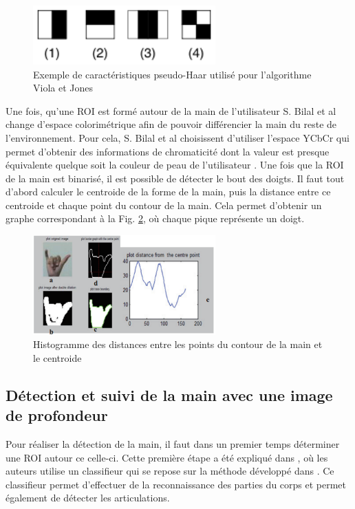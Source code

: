 \begin{figure}[!h]
\center
\includegraphics[width=7cm]{images/pseudo_haar.png}
\caption{Exemple de caractéristiques pseudo-Haar utilisé pour l'algorithme Viola et Jones}
\label{fig:pseudo_haar}
\end{figure}

Une fois, qu'une ROI est formé autour de la main de l'utilisateur S. Bilal et al \cite{haarlike} change d'espace colorimétrique
afin de pouvoir différencier la main du reste de l'environnement. Pour cela, S. Bilal et al \cite{haarlike} choisissent 
d'utiliser l'espace YCbCr qui permet d'obtenir des informations de chromaticité dont la valeur est presque équivalente
quelque soit la couleur de peau de l'utilisateur \cite{yoo1999fast}. Une fois que la ROI de la main est binarisé, il est possible
de détecter le bout des doigts. Il faut tout d'abord calculer le centroide de la forme de la main, puis la distance entre
ce centroide et chaque point du contour de la main. Cela permet d'obtenir un graphe correspondant à la Fig. \ref{fig:handHisto}, où chaque
pique représente un doigt.

\begin{figure}[!h]
\center
\includegraphics[width=7cm]{images/handHisto.png}
\caption{Histogramme des distances entre les points du contour de la main et le centroide}
\label{fig:handHisto}
\end{figure}

\subsection{Détection et suivi de la main avec une image de profondeur}
Pour réaliser la détection de la main, il faut dans un premier temps déterminer une ROI
autour ce celle-ci. Cette première étape a été expliqué dans \cite{export:238453}, où les auteurs utilise un classifieur
qui se repose sur la méthode développé dans \cite{export:145347}. Ce classifieur permet d'effectuer de la reconnaissance
des parties du corps et permet également de détecter les articulations.


